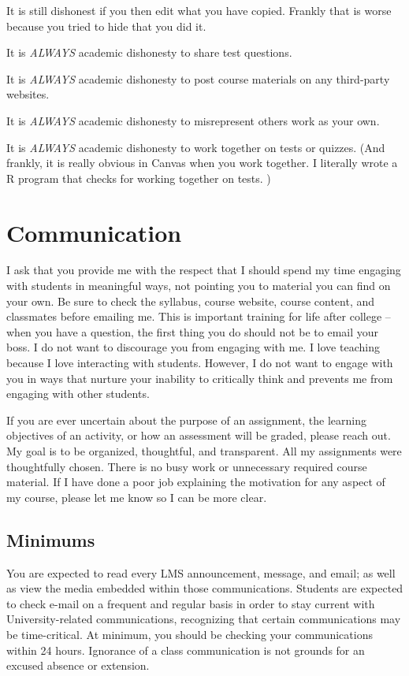 It is still dishonest if you then edit what you have copied. Frankly that is worse because you tried to hide that you did it.

It is \emph{ALWAYS} academic dishonesty to share test questions.

It is \emph{ALWAYS} academic dishonesty to post course materials on any third-party websites.

It is \emph{ALWAYS} academic dishonesty to misrepresent others work as your own.

It is \emph{ALWAYS} academic dishonesty to work together on tests or quizzes.
(And frankly, it is really obvious in Canvas when you work together.
I literally wrote a R program that checks for working together on tests. )

\hypertarget{communication}{%
\chapter{Communication}\label{communication}}

I ask that you provide me with the respect that I should spend my time engaging with students in meaningful ways, not pointing you to material you can find on your own. Be sure to check the syllabus, course website, course content, and classmates before emailing me. This is important training for life after college -- when you have a question, the first thing you do should not be to email your boss. I do not want to discourage you from engaging with me. I love teaching because I love interacting with students. However, I do not want to engage with you in ways that nurture your inability to critically think and prevents me from engaging with other students.

If you are ever uncertain about the purpose of an assignment, the learning objectives of an activity, or how an assessment will be graded, please reach out. My goal is to be organized, thoughtful, and transparent. All my assignments were thoughtfully chosen. There is no busy work or unnecessary required course material. If I have done a poor job explaining the motivation for any aspect of my course, please let me know so I can be more clear.

\hypertarget{minimums}{%
\section{Minimums}\label{minimums}}

You are expected to read every LMS announcement, message, and email; as well as view the media embedded within those communications. Students are expected to check e-mail on a frequent and regular basis in order to stay current with University-related communications, recognizing that certain communications may be time-critical. At minimum, you should be checking your communications within 24 hours. Ignorance of a class communication is not grounds for an excused absence or extension.

